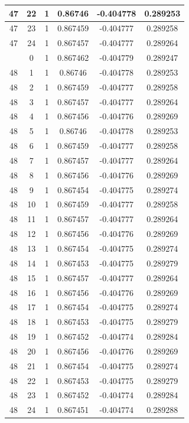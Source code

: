 \documentclass[12pt,a4paper]{article}
\numberwithin{equation}{section}
\numberwithin{figure}{section}
\numberwithin{table}{section}
\begin{document}
\begin{longtable}{|c|c|c|c|c|c|}
47 & 22 & 1 & 0.86746 & -0.404778 & 0.289253 \\ \hline
47 & 23 & 1 & 0.867459 & -0.404777 & 0.289258 \\ \hline
47 & 24 & 1 & 0.867457 & -0.404777 & 0.289264 \\ \hline
\pagebreak
48 & 0 & 1 & 0.867462 & -0.404779 & 0.289247 \\ \hline
48 & 1 & 1 & 0.86746 & -0.404778 & 0.289253 \\ \hline
48 & 2 & 1 & 0.867459 & -0.404777 & 0.289258 \\ \hline
48 & 3 & 1 & 0.867457 & -0.404777 & 0.289264 \\ \hline
48 & 4 & 1 & 0.867456 & -0.404776 & 0.289269 \\ \hline
48 & 5 & 1 & 0.86746 & -0.404778 & 0.289253 \\ \hline
48 & 6 & 1 & 0.867459 & -0.404777 & 0.289258 \\ \hline
48 & 7 & 1 & 0.867457 & -0.404777 & 0.289264 \\ \hline
48 & 8 & 1 & 0.867456 & -0.404776 & 0.289269 \\ \hline
48 & 9 & 1 & 0.867454 & -0.404775 & 0.289274 \\ \hline
48 & 10 & 1 & 0.867459 & -0.404777 & 0.289258 \\ \hline
48 & 11 & 1 & 0.867457 & -0.404777 & 0.289264 \\ \hline
48 & 12 & 1 & 0.867456 & -0.404776 & 0.289269 \\ \hline
48 & 13 & 1 & 0.867454 & -0.404775 & 0.289274 \\ \hline
48 & 14 & 1 & 0.867453 & -0.404775 & 0.289279 \\ \hline
48 & 15 & 1 & 0.867457 & -0.404777 & 0.289264 \\ \hline
48 & 16 & 1 & 0.867456 & -0.404776 & 0.289269 \\ \hline
48 & 17 & 1 & 0.867454 & -0.404775 & 0.289274 \\ \hline
48 & 18 & 1 & 0.867453 & -0.404775 & 0.289279 \\ \hline
48 & 19 & 1 & 0.867452 & -0.404774 & 0.289284 \\ \hline
48 & 20 & 1 & 0.867456 & -0.404776 & 0.289269 \\ \hline
48 & 21 & 1 & 0.867454 & -0.404775 & 0.289274 \\ \hline
48 & 22 & 1 & 0.867453 & -0.404775 & 0.289279 \\ \hline
48 & 23 & 1 & 0.867452 & -0.404774 & 0.289284 \\ \hline
48 & 24 & 1 & 0.867451 & -0.404774 & 0.289288 \\ \hline

\end{longtable}
\end{document}
